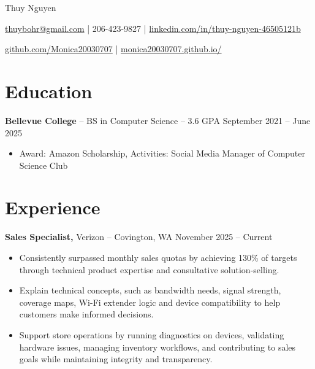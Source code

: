 \documentclass[11pt]{article}       %
\begin{document}
\centerline{\Huge Thuy Nguyen}

\vspace{5pt}

\centerline{\href{mailto:thuybohr@gmail.com}{thuybohr@gmail.com} | 206-423-9827 |
\href{https://www.linkedin.com/in/thuy-nguyen-46505121b/}{linkedin.com/in/thuy-nguyen-46505121b}}

\centerline{\href{https://github.com/Monica20030707}{github.com/Monica20030707} | 
\href{https://monica20030707.github.io/}{monica20030707.github.io/}} 

\vspace{-9pt}

\section*{Education}
\textbf{Bellevue College} -- BS in Computer Science -- 3.6 GPA \hfill September 2021 -- June 2025\\
\vspace{-9pt}
\begin{itemize}
  \item Award: Amazon Scholarship, Activities: Social Media Manager of Computer Science Club
\end{itemize}

\vspace{-18.5pt}

\section*{Experience}

\textbf{Sales Specialist,} {Verizon} -- Covington, WA \hfill November 2025 -- Current \\
\vspace{-9pt}
\begin{itemize}
  \item Consistently surpassed monthly sales quotas by achieving 130\% of targets through technical product expertise and consultative solution-selling.
  \item Explain technical concepts, such as bandwidth needs, signal strength, coverage maps, Wi-Fi extender logic and device compatibility to help customers make informed decisions.
  \item Support store operations by running diagnostics on devices, validating hardware issues, managing inventory workflows, and contributing to sales goals while maintaining integrity and transparency.
\end{itemize}
\end{document}

